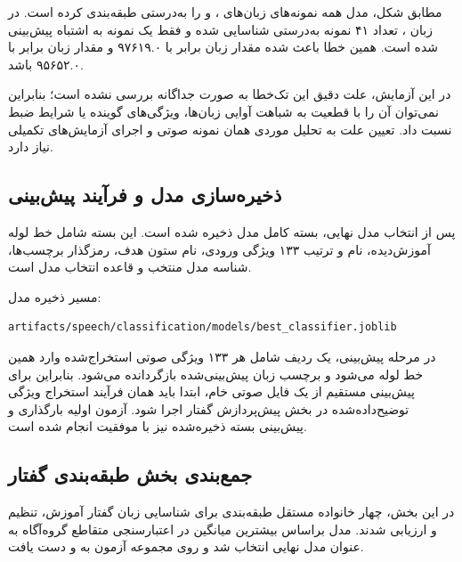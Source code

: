 \documentclass[12pt,a4paper,oneside]{report}
\begin{document}
مطابق شکل، مدل همه نمونه‌های زبان‌های ،  و  را
به‌درستی طبقه‌بندی کرده است. در زبان ، تعداد ۴۱ نمونه به‌درستی
شناسایی شده و فقط یک نمونه به اشتباه  پیش‌بینی شده است. همین خطا
باعث شده مقدار  زبان  برابر با ۹۷۶۱۹.۰ و مقدار
 زبان  برابر با ۹۵۶۵۲.۰ باشد.

در این آزمایش، علت دقیق این تک‌خطا به صورت جداگانه بررسی نشده است؛ بنابراین
نمی‌توان آن را با قطعیت به شباهت آوایی زبان‌ها، ویژگی‌های گوینده یا شرایط
ضبط نسبت داد. تعیین علت به تحلیل موردی همان نمونه صوتی و اجرای آزمایش‌های
تکمیلی نیاز دارد.


\subsection{ذخیره‌سازی مدل و فرآیند پیش‌بینی}

پس از انتخاب مدل نهایی، بسته کامل مدل ذخیره شده است. این بسته شامل خط لوله
آموزش‌دیده، نام و ترتیب ۱۳۳ ویژگی ورودی، نام ستون هدف، رمزگذار برچسب‌ها،
شناسه مدل منتخب و قاعده انتخاب مدل است.

مسیر ذخیره مدل:

\begin{latin}
\begin{verbatim}
artifacts/speech/classification/models/best_classifier.joblib
\end{verbatim}
\end{latin}

در مرحله پیش‌بینی، یک ردیف شامل هر ۱۳۳ ویژگی صوتی استخراج‌شده وارد همین
خط لوله می‌شود و برچسب زبان پیش‌بینی‌شده بازگردانده می‌شود. بنابراین برای
پیش‌بینی مستقیم از یک فایل صوتی خام، ابتدا باید همان فرآیند استخراج ویژگی
توضیح‌داده‌شده در بخش پیش‌پردازش گفتار اجرا شود. آزمون اولیه بارگذاری و
پیش‌بینی بسته ذخیره‌شده نیز با موفقیت انجام شده است.


\subsection{جمع‌بندی بخش طبقه‌بندی گفتار}

در این بخش، چهار خانواده مستقل طبقه‌بندی برای شناسایی زبان گفتار آموزش،
تنظیم و ارزیابی شدند. مدل  براساس بیشترین میانگین
 در اعتبارسنجی متقاطع گروه‌آگاه به عنوان مدل نهایی انتخاب شد
و روی مجموعه آزمون به  و
 دست یافت.
\end{document}

